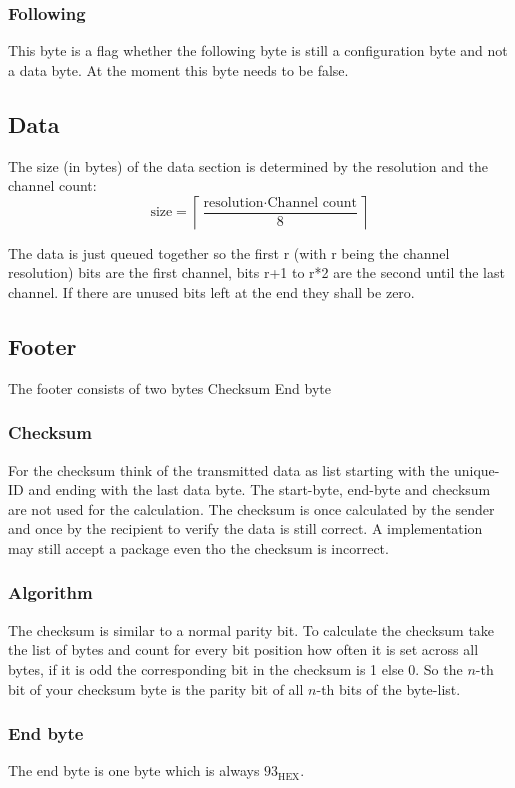\documentclass{scrreprt}
\begin{document}
\subsubsection{Following}
This byte is a flag whether the following byte is still a configuration
byte and not a data byte. At the moment this byte needs to be false.

\subsection{Data}
The size (in bytes) of the data section is determined by
the resolution and the channel count:
\begin{equation}
  \text{size} = \left\lceil{\frac{\text{resolution} \cdot \text{Channel count}}{8}} \right\rceil
\end{equation}

The data is just queued together so the first r (with r being the channel
resolution) bits are the first channel, bits r+1 to r*2 are the second
until the last channel. If there are unused bits left at the end they shall be zero.

\subsection{Footer}
The footer consists of two bytes Checksum End byte

\subsubsection{Checksum}
For the checksum think of the transmitted data as list starting with the
unique-ID and ending with the last data byte. The start-byte, end-byte and checksum are not used for the calculation. 
The checksum is once calculated by the sender and once by the recipient to verify the data is
still correct. A implementation may still accept a package even tho the checksum is incorrect.

\subsubsection{Algorithm}
The checksum is similar to a normal parity bit. To calculate the checksum
take the list of bytes and count for every bit position how often it is set across all bytes,
if it is odd the corresponding bit in the checksum is 1 else 0.
So the $n$-th bit of your checksum byte is the parity bit of all $n$-th
bits of the byte-list.

\subsubsection{End byte}
The end byte is one byte which is always $93_\text{HEX}$.
\end{document}
